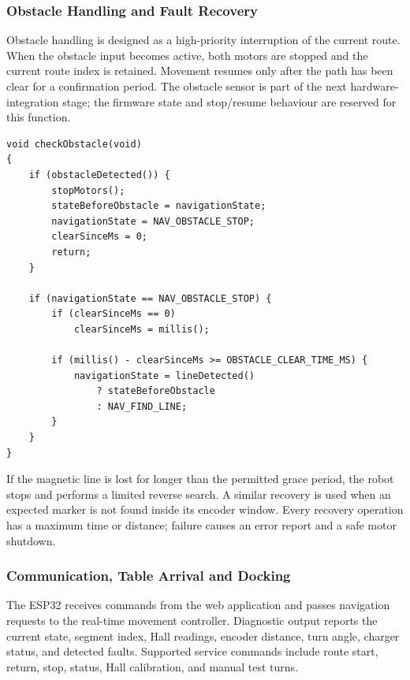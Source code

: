 \documentclass[12pt,a4paper]{article}
\begin{document}
\subsubsection{Obstacle Handling and Fault Recovery}

Obstacle handling is designed as a high-priority interruption of the current
route. When the obstacle input becomes active, both motors are stopped and the
current route index is retained. Movement resumes only after the path has been
clear for a confirmation period. The obstacle sensor is part of the next
hardware-integration stage; the firmware state and stop/resume behaviour are
reserved for this function.

\begin{lstlisting}[caption={Obstacle-stop and controlled resume behaviour.},label={lst:obstacle}]
void checkObstacle(void)
{
    if (obstacleDetected()) {
        stopMotors();
        stateBeforeObstacle = navigationState;
        navigationState = NAV_OBSTACLE_STOP;
        clearSinceMs = 0;
        return;
    }

    if (navigationState == NAV_OBSTACLE_STOP) {
        if (clearSinceMs == 0)
            clearSinceMs = millis();

        if (millis() - clearSinceMs >= OBSTACLE_CLEAR_TIME_MS) {
            navigationState = lineDetected()
                ? stateBeforeObstacle
                : NAV_FIND_LINE;
        }
    }
}
\end{lstlisting}

If the magnetic line is lost for longer than the permitted grace period, the
robot stops and performs a limited reverse search. A similar recovery is used
when an expected marker is not found inside its encoder window. Every recovery
operation has a maximum time or distance; failure causes an error report and a
safe motor shutdown.

\subsubsection{Communication, Table Arrival and Docking}

The ESP32 receives commands from the web application and passes navigation
requests to the real-time movement controller. Diagnostic output reports the
current state, segment index, Hall readings, encoder distance, turn angle,
charger status, and detected faults. Supported service commands include route
start, return, stop, status, Hall calibration, and manual test turns.
\end{document}
